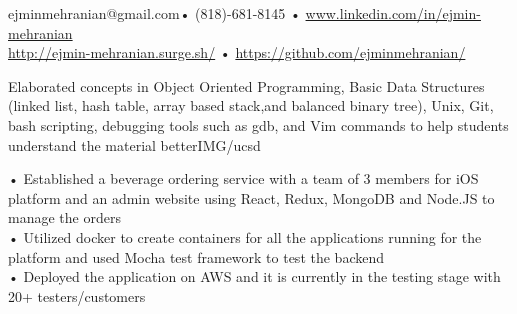 \documentclass[paper=a4,fontsize=11pt]{temp} %
\begin{document}
\begin{minipage}{1.0\linewidth}
   
   
    ejminmehranian@gmail.com\hspace{0.5cm}• \hspace{0.5cm} (818)-681-8145 \hspace{0.5cm} • \hspace{0.5cm} \url {www.linkedin.com/in/ejmin-mehranian} \\ \url{http://ejmin-mehranian.surge.sh/} \hspace{0.41cm}• \hspace{0.6cm} \url{https://github.com/ejminmehranian/}
 
\end{minipage}

\noindent


{Elaborated concepts in Object Oriented Programming, Basic Data Structures (linked list, hash table, array based stack,and balanced binary tree), Unix, Git, bash scripting, debugging tools such as gdb, and Vim commands to help students understand the material better}{IMG/ucsd}

\noindent

{• Established a beverage ordering service with a team of 3 members for iOS platform and an admin website using React, Redux, MongoDB and Node.JS to manage the orders
\\ • Utilized docker to create containers for all the applications running for the platform  and used Mocha test framework to test the backend
\\ • Deployed the application on AWS and it is currently in the testing stage with 20+ testers/customers
} {}
\end{document}
